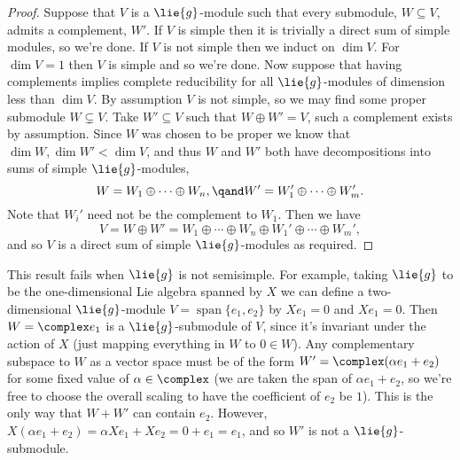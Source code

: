 \documentclass[fleqn]{NotesClass}
\DeclareMathOperator{\Span}{span}
\begin{document}
\begin{lma}{}{}
\begin{proof}
            Suppose that \(V\) is a \(\lie{g}\)-module such that every submodule, \(W \subseteq V\), admits a complement, \(W'\).
            If \(V\) is simple then it is trivially a direct sum of simple modules, so we're done.
            If \(V\) is not simple then we induct on \(\dim V\).
            For \(\dim V = 1\) then \(V\) is simple and so we're done.
            Now suppose that having complements implies complete reducibility for all \(\lie{g}\)-modules of dimension less than \(\dim V\).
            By assumption \(V\) is not simple, so we may find some proper submodule \(W \subsetneq V\).
            Take \(W' \subseteq V\) such that \(W \oplus W' = V\), such a complement exists by assumption.
            Since \(W\) was chosen to be proper we know that \(\dim W, \dim W' < \dim V\), and thus \(W\) and \(W'\) both have decompositions into sums of simple \(\lie{g}\)-modules,
            \begin{equation}
                W = W_1 \oplus \dotsb \oplus W_n, \qand W' = W_1' \oplus \dotsb \oplus W_m'.
            \end{equation}
            Note that \(W_i'\) need not be the complement to \(W_1\).
            Then we have
            \begin{equation}
                V = W \oplus W' = W_1 \oplus \dotsb \oplus W_n \oplus W_1' \oplus \dotsb \oplus W_m',
            \end{equation}
            and so \(V\) is a direct sum of simple \(\lie{g}\)-modules as required.
        \end{proof}
    \end{lma}
    
    This result fails when \(\lie{g}\) is not semisimple.
    For example, taking \(\lie{g}\) to be the one-dimensional Lie algebra spanned by \(X\) we can define a two-dimensional \(\lie{g}\)-module \(V = \Span\{e_1, e_2\}\) by \(Xe_1 = 0\) and \(Xe_1 = 0\).
    Then \(W = \complex e_1\) is a \(\lie{g}\)-submodule of \(V\), since it's invariant under the action of \(X\) (just mapping everything in \(W\) to \(0 \in W\)).
    Any complementary subspace to \(W\) as a vector space must be of the form \(W' = \complex (\alpha e_1 + e_2)\) for some fixed value of \(\alpha \in \complex\) (we are taken the span of \(\alpha e_1 + e_2\), so we're free to choose the overall scaling to have the coefficient of \(e_2\) be \(1\)).
    This is the only way that \(W + W'\) can contain \(e_2\).
    However, \(X(\alpha e_1 + e_2) = \alpha X e_1 + X e_2 = 0 + e_1 = e_1\), and so \(W'\) is not a \(\lie{g}\)-submodule.
    
\end{document}
